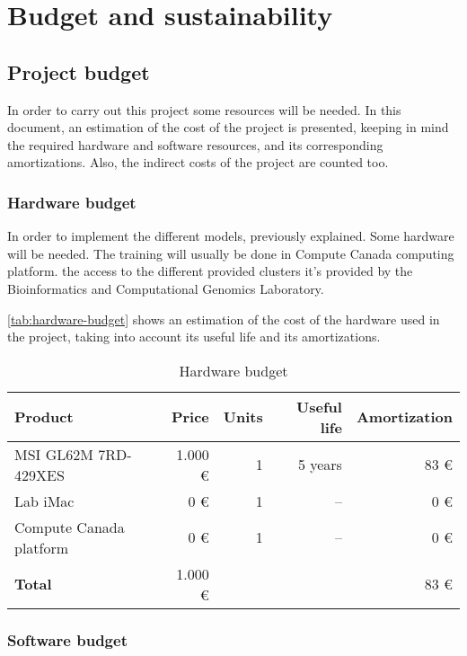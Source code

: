 \section{Budget and sustainability}

\subsection{Project budget}

In order to carry out this project some resources will be needed. In this document, 
an estimation of the cost of the project is presented, keeping in mind the required
hardware and software resources, and its corresponding amortizations. Also, the
indirect costs of the project are counted too.

\subsubsection{Hardware budget}

In order to implement the different models, previously explained. Some hardware will be
needed. The training will usually be done in Compute Canada computing platform. the
access to the different provided clusters it's provided by the Bioinformatics and 
Computational Genomics Laboratory.

\autoref{tab:hardware-budget} shows an estimation of the cost of the hardware used in the
project, taking into account its useful life and its amortizations.

\begin{table}[H]
  \centering
  \begin{tabular}{|l|r|r|r|r|}
    \hline
    \textbf{Product} & \textbf{Price} & \textbf{Units} & \textbf{Useful life} 
    & \textbf{Amortization} \\ \hline\hline

    MSI GL62M 7RD-429XES & 1.000 € & 1 & 5 years & 83 € \\ \hline
    Lab iMac & 0 € & 1 & -- & 0 € \\ \hline
    Compute Canada platform & 0 € & 1 & -- & 0 € \\ \hline

    \hline\hline
    \textbf{Total} & 1.000 € & \multicolumn{2}{|c|}{} & 83 € \\ \hline
  \end{tabular}
  \caption{Hardware budget \label{tab:hardware-budget}}
\end{table}

\subsubsection{Software budget}

